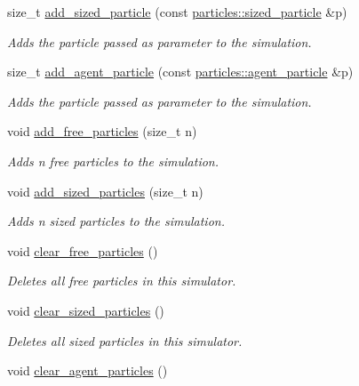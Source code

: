\begin{DoxyCompactItemize}
size\+\_\+t \hyperlink{classphysim_1_1simulator_aa7b066130ec71e7f8985ebc94605cf3b}{add\+\_\+sized\+\_\+particle} (const \hyperlink{classphysim_1_1particles_1_1sized__particle}{particles\+::sized\+\_\+particle} \&p)
\begin{DoxyCompactList}\small\item\em Adds the particle passed as parameter to the simulation. \end{DoxyCompactList}\item 
size\+\_\+t \hyperlink{classphysim_1_1simulator_a73e277b53d80d584fd8d72b586ff7b80}{add\+\_\+agent\+\_\+particle} (const \hyperlink{classphysim_1_1particles_1_1agent__particle}{particles\+::agent\+\_\+particle} \&p)
\begin{DoxyCompactList}\small\item\em Adds the particle passed as parameter to the simulation. \end{DoxyCompactList}\item 
void \hyperlink{classphysim_1_1simulator_a8729cd8c3590730d8897f61f2320f3e8}{add\+\_\+free\+\_\+particles} (size\+\_\+t n)
\begin{DoxyCompactList}\small\item\em Adds {\itshape n} free particles to the simulation. \end{DoxyCompactList}\item 
void \hyperlink{classphysim_1_1simulator_ae0551469d3c6b536da89bce04ff93fee}{add\+\_\+sized\+\_\+particles} (size\+\_\+t n)
\begin{DoxyCompactList}\small\item\em Adds {\itshape n} sized particles to the simulation. \end{DoxyCompactList}\item 
void \hyperlink{classphysim_1_1simulator_a3b6c748422ce495c2f26130136f6c460}{clear\+\_\+free\+\_\+particles} ()
\begin{DoxyCompactList}\small\item\em Deletes all free particles in this simulator. \end{DoxyCompactList}\item 
void \hyperlink{classphysim_1_1simulator_a4aa10ffe26a505dfa9ad5e6875a2964f}{clear\+\_\+sized\+\_\+particles} ()
\begin{DoxyCompactList}\small\item\em Deletes all sized particles in this simulator. \end{DoxyCompactList}\item 
void \hyperlink{classphysim_1_1simulator_a903bf3d4f155e8e524d4031b24042142}{clear\+\_\+agent\+\_\+particles} ()

\end{DoxyCompactItemize}
